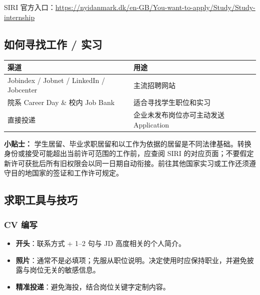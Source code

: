 SIRI 官方入口：\url{https://nyidanmark.dk/en-GB/You-want-to-apply/Study/Study-internship}

\subsection{如何寻找工作 / 实习}

\begin{table}[ht]
  \small
  \centering
  \setlength{\tabcolsep}{6pt}
  \label{tab:job-channels}
  \begin{tabularx}{\textwidth}{p{} X}
    \toprule
    \textbf{渠道} & \textbf{用途} \\
    \midrule
    Jobindex / Jobnet / LinkedIn / Jobcenter & 主流招聘网站 \\
    院系 Career Day \& 校内 Job Bank & 适合寻找学生职位和实习 \\
    直接投递 & 企业未发布岗位亦可主动发送 Application \\
    \bottomrule
  \end{tabularx}
\end{table}

\begin{grayleftbox}\textbf{小贴士： }
学生居留、毕业求职居留和以工作为依据的居留是不同法律基础。转换身份或接受可能超出当前许可范围的工作前，应查阅 SIRI 的对应页面；不要假定新许可获批后所有旧权限会以同一日期自动衔接。前往其他国家实习或工作还须遵守目的地国家的签证和工作许可规定。
\end{grayleftbox}

\subsection{求职工具与技巧}

\subsubsection{CV 编写}
\begin{itemize}[leftmargin=1.5em]
  \item \textbf{开头}：联系方式 + 1–2 句与 JD 高度相关的个人简介。
  \item \textbf{照片}：通常不是必填项；先服从职位说明。决定使用时应保持职业，并避免披露与岗位无关的敏感信息。
  \item \textbf{精准投递}：避免海投，结合岗位关键字定制内容。
\end{itemize}

